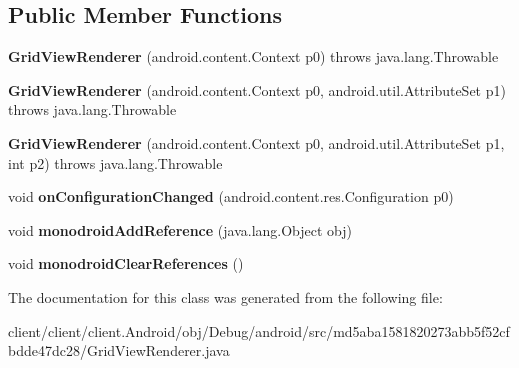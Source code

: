 \subsection*{Public Member Functions}
\begin{DoxyCompactItemize}
\item 
\hypertarget{classmd5aba1581820273abb5f52cfbdde47dc28_1_1GridViewRenderer_ae51e30f522eb41f71800f2fa07e38ccf}{}{\bfseries Grid\+View\+Renderer} (android.\+content.\+Context p0)  throws java.\+lang.\+Throwable 	\label{classmd5aba1581820273abb5f52cfbdde47dc28_1_1GridViewRenderer_ae51e30f522eb41f71800f2fa07e38ccf}

\item 
\hypertarget{classmd5aba1581820273abb5f52cfbdde47dc28_1_1GridViewRenderer_a46a89bd845ff6f94d49e4f63025c26fd}{}{\bfseries Grid\+View\+Renderer} (android.\+content.\+Context p0, android.\+util.\+Attribute\+Set p1)  throws java.\+lang.\+Throwable 	\label{classmd5aba1581820273abb5f52cfbdde47dc28_1_1GridViewRenderer_a46a89bd845ff6f94d49e4f63025c26fd}

\item 
\hypertarget{classmd5aba1581820273abb5f52cfbdde47dc28_1_1GridViewRenderer_ad6b41adbc346ec8d5db7b16223a346d4}{}{\bfseries Grid\+View\+Renderer} (android.\+content.\+Context p0, android.\+util.\+Attribute\+Set p1, int p2)  throws java.\+lang.\+Throwable 	\label{classmd5aba1581820273abb5f52cfbdde47dc28_1_1GridViewRenderer_ad6b41adbc346ec8d5db7b16223a346d4}

\item 
\hypertarget{classmd5aba1581820273abb5f52cfbdde47dc28_1_1GridViewRenderer_a61a8f3939849fcd6f93abd175c97df84}{}void {\bfseries on\+Configuration\+Changed} (android.\+content.\+res.\+Configuration p0)\label{classmd5aba1581820273abb5f52cfbdde47dc28_1_1GridViewRenderer_a61a8f3939849fcd6f93abd175c97df84}

\item 
\hypertarget{classmd5aba1581820273abb5f52cfbdde47dc28_1_1GridViewRenderer_aba39ae1c4435297b3d079d5497d964e4}{}void {\bfseries monodroid\+Add\+Reference} (java.\+lang.\+Object obj)\label{classmd5aba1581820273abb5f52cfbdde47dc28_1_1GridViewRenderer_aba39ae1c4435297b3d079d5497d964e4}

\item 
\hypertarget{classmd5aba1581820273abb5f52cfbdde47dc28_1_1GridViewRenderer_ab1f5910aab68b798932cd783d7a719a9}{}void {\bfseries monodroid\+Clear\+References} ()\label{classmd5aba1581820273abb5f52cfbdde47dc28_1_1GridViewRenderer_ab1f5910aab68b798932cd783d7a719a9}

\end{DoxyCompactItemize}


The documentation for this class was generated from the following file\+:\begin{DoxyCompactItemize}
\item 
client/client/client.\+Android/obj/\+Debug/android/src/md5aba1581820273abb5f52cfbdde47dc28/Grid\+View\+Renderer.\+java\end{DoxyCompactItemize}

